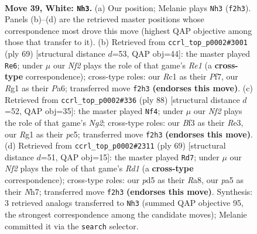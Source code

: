 \documentclass[11pt]{article}
\begin{document}
\clearpage

\begin{figure}[p]\centering
\begin{subfigure}{0.46\textwidth}\centering
\resizebox{\linewidth}{!}{%
\newchessgame
\chessboard[
  setfen={3r1k2/3b1p1p/1p4r1/p2p4/P5P1/1P1K1B2/5N1P/2R3R1 w - - 1 39},
  showmover=false,
  pgfstyle=straightmove, color=movearrow, markmove={f2-h3}
]}
\caption{}
\end{subfigure}\hfill
\begin{subfigure}{0.46\textwidth}\centering
\resizebox{\linewidth}{!}{%
\newchessgame
\chessboard[
  setfen={3rr1k1/5pp1/pn1P4/1p4P1/2pR4/P1B1P3/5P1K/2R5 b - - 2 35},
  showmover=false,
  pgfstyle=straightmove, color=movearrow, markmove={e8-e6}
]}
\caption{}
\end{subfigure}
\\[4pt]
\begin{subfigure}{0.46\textwidth}\centering
\resizebox{\linewidth}{!}{%
\newchessgame
\chessboard[
  setfen={2b3r1/7p/3k4/p1p3PP/3rp2K/1P2R3/P5N1/5R2 w - - 6 45},
  showmover=false,
  pgfstyle=straightmove, color=movearrow, markmove={g2-f4}
]}
\caption{}
\end{subfigure}\hfill
\begin{subfigure}{0.46\textwidth}\centering
\resizebox{\linewidth}{!}{%
\newchessgame
\chessboard[
  setfen={r2r2k1/7n/1BRp3b/1p1P1Pp1/4p1Pp/7P/1P1R4/3B2K1 b - - 6 35},
  showmover=false,
  pgfstyle=straightmove, color=movearrow, markmove={d8-d7}
]}
\caption{}
\end{subfigure}
\caption{\textbf{Move 39, White: \texttt{Nh3}.} (a) Our position; Melanie plays \texttt{Nh3} (\texttt{f2h3}). Panels (b)--(d) are the retrieved master positions whose correspondence most drove this move (highest QAP objective among those that transfer to it). (b) Retrieved from \texttt{ccrl\_top\_p0002\#3001} (ply 69) [structural distance $d$=53, QAP obj=44]: the master played \texttt{Re6}; under $\mu$ our \emph{Nf2} plays the role of that game's \emph{Re1} (a \textbf{cross-type} correspondence); cross-type roles: our \emph{R}c1 as their \emph{P}f7, our \emph{R}g1 as their \emph{P}a6; transferred move \texttt{f2h3} \textbf{(endorses this move)}. (c) Retrieved from \texttt{ccrl\_top\_p0002\#336} (ply 88) [structural distance $d$=52, QAP obj=35]: the master played \texttt{Nf4}; under $\mu$ our \emph{Nf2} plays the role of that game's \emph{Ng2}; cross-type roles: our \emph{B}f3 as their \emph{R}e3, our \emph{R}g1 as their \emph{p}c5; transferred move \texttt{f2h3} \textbf{(endorses this move)}. (d) Retrieved from \texttt{ccrl\_top\_p0002\#2311} (ply 69) [structural distance $d$=51, QAP obj=15]: the master played \texttt{Rd7}; under $\mu$ our \emph{Nf2} plays the role of that game's \emph{Rd1} (a \textbf{cross-type} correspondence); cross-type roles: our \emph{p}d5 as their \emph{R}a8, our \emph{p}a5 as their \emph{N}h7; transferred move \texttt{f2h3} \textbf{(endorses this move)}. Synthesis: 3 retrieved analogs transferred to \texttt{Nh3} (summed QAP objective 95, the strongest correspondence among the candidate moves); Melanie committed it via the \texttt{search} selector.}
\label{fig:thought-m76}
\end{figure}
\end{document}
